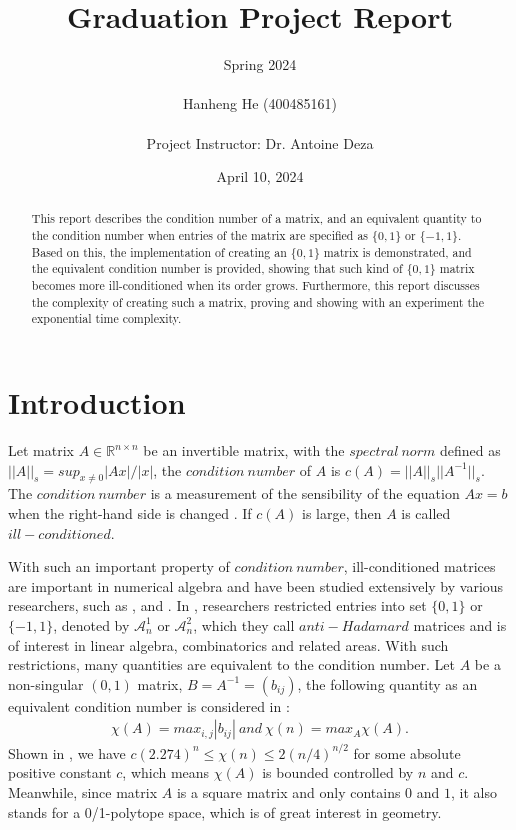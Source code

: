 \documentclass[11pt]{article}
\title{\textbf{ Graduation Project Report }}
\author{Spring 2024 \\ \\ Hanheng He (400485161) \\ \\ Project Instructor: Dr. Antoine Deza }
\date{April 10, 2024}
\begin{document}
\maketitle

\pagestyle{fancy}

\begin{abstract}
    This report describes the condition number of a matrix, and an equivalent quantity to the condition number when entries of the matrix are specified as $\{0, 1\}$ or $\{-1, 1\}$. Based on this, the implementation of creating an $\{0, 1\}$ matrix is demonstrated, and the equivalent condition number is provided, showing that such kind of $\{0, 1\}$ matrix becomes more ill-conditioned when its order grows. Furthermore, this report discusses the complexity of creating such a matrix, proving and showing with an experiment the exponential time complexity.
\end{abstract}
\tableofcontents



\pagebreak
\section{Introduction}

Let matrix $A \in \mathbb{R}^{n\times n}$ be an invertible matrix, with the $spectral \ norm$ defined as $||A||_s = sup_{x\neq0}|Ax|/|x|$, the $condition\ number$ of $A$ is $c(A) = ||A||_s||A^{-1}||_s$. The $condition\ number$ is a measurement of the sensibility of the equation $Ax = b$ when the right-hand side is changed \cite{ALON1997133}. If $c(A)$ is large, then $A$ is called $ill-conditioned$.

With such an important property of $condition\ number$, ill-conditioned matrices are important in numerical algebra and have been studied extensively by various researchers, such as \cite{doi:10.1137/1018113}, \cite{wilkinson1972note} and \cite{neumaier1998solving}. In \cite{GRAHAM1984113}, researchers restricted entries into set $\{0, 1\}$ or $\{-1, 1\}$, denoted by $\mathcal{A}_n^1$ or $\mathcal{A}_n^2$, which they call $anti-Hadamard$ matrices and is of interest in linear algebra, combinatorics and related areas. With such restrictions, many quantities are equivalent to the condition number. Let $A$ be a non-singular $(0, 1)$ matrix, $B = A^{-1} = (b_{ij})$, the following quantity as an equivalent condition number is considered in \cite{GRAHAM1984113}:
\begin{align*}
\chi(A) = max_{i, j}|b_{ij}|\ and\ \chi(n) = max_A \chi(A).
\end{align*}
Shown in \cite{GRAHAM1984113}, we have $c(2.274)^n \leq \chi(n) \leq 2(n/4)^{n/2}$ for some absolute positive constant $c$, which means $\chi(A)$ is bounded controlled by $n$ and $c$. Meanwhile, since matrix $A$ is a square matrix and only contains $0$ and $1$, it also stands for a 0/1-polytope space, which is of great interest in geometry.
\end{document}
